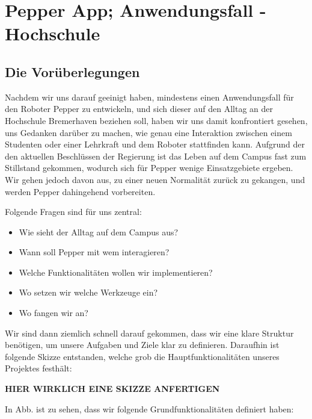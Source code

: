 \chapter{Pepper App; Anwendungsfall - Hochschule}
\label{sec:anwendungsfall-hochschule}

\section{Die Vorüberlegungen}
Nachdem wir uns darauf geeinigt haben, mindestens einen Anwendungsfall für den Roboter Pepper zu entwickeln,
und sich dieser auf den Alltag an der Hochschule Bremerhaven beziehen soll, haben wir uns damit konfrontiert gesehen,
uns Gedanken darüber zu machen, wie genau eine Interaktion zwischen einem Studenten oder einer Lehrkraft und dem Roboter
stattfinden kann. Aufgrund der den aktuellen Beschlüssen der Regierung ist das Leben auf dem Campus fast zum Stillstand gekommen,
wodurch sich für Pepper wenige Einsatzgebiete ergeben. Wir gehen jedoch davon aus, zu einer neuen Normalität zurück zu gekangen,
und werden Pepper dahingehend vorbereiten.

Folgende Fragen sind für uns zentral:
\begin{itemize}
    \item Wie sieht der Alltag auf dem Campus aus?
    \item Wann soll Pepper mit wem interagieren?
    \item Welche Funktionalitäten wollen wir implementieren?
    \item Wo setzen wir welche Werkzeuge ein?
    \item Wo fangen wir an?
\end{itemize}

Wir sind dann ziemlich schnell darauf gekommen, dass wir eine klare Struktur benötigen,
um unsere Aufgaben und Ziele klar zu definieren. Daraufhin ist folgende Skizze entstanden,
welche grob die Hauptfunktionalitäten unseres Projektes festhält:
\begin{center}
    \textbf{HIER WIRKLICH EINE SKIZZE ANFERTIGEN}
\end{center}



In Abb. %
ist zu sehen, dass wir folgende Grundfunktionalitäten definiert haben:

